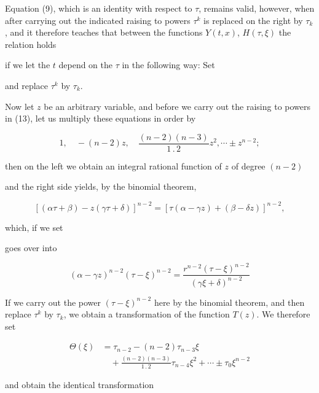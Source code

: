 Equation (9), which is an identity with respect to $\tau$, remains
valid, however, when after carrying out the indicated raising to
powers $\tau^k$ is replaced on the right by $\tau_k$, and it therefore teaches
that between the functions $Y(t, x)$, $H(\tau, \xi)$ the relation holds


if we let the $t$ depend on the $\tau$ in the following way:
Set


and  replace $\tau^k$ by $\tau_k$.

Now let $z$ be an arbitrary variable, and before we carry out
the raising to powers in (13), let us multiply these equations
in order by

\[
1, \quad -(n-2)z, \quad \frac{(n-2)(n-3)}{1\,.\,2}z^2, \cdots \pm z^{n-2};
\]

then on the left we obtain an integral rational function of $z$
of degree $(n-2)$


and the right side yields, by the binomial theorem,

\[
[(\alpha\tau+\beta) - z(\gamma\tau+\delta)]^{n-2} = [\tau(\alpha-\gamma z) + (\beta-\delta z)]^{n-2},
\]

which, if we set


goes over into

\[
(\alpha-\gamma z)^{n-2}(\tau-\xi)^{n-2} = \frac{r^{n-2}(\tau-\xi)^{n-2}}{(\gamma\xi+\delta)^{n-2}}
\]

If we carry out the power $(\tau-\xi)^{n-2}$ here by the binomial
theorem, and then replace $\tau^k$ by $\tau_k$, we obtain a transformation
of the function $T(z)$. We therefore set


\[
\begin{aligned}
\Theta(\xi) &= \tau_{n-2} - (n-2)\tau_{n-3}\xi\\
&\quad + \frac{(n-2)(n-3)}{1\,.\,2}\tau_{n-4}\xi^2 + \cdots \pm \tau_0\xi^{n-2}
\end{aligned}
\]

and obtain the identical transformation

